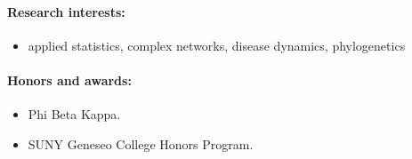\documentclass[a4paper]{article}
\begin{document}
\paragraph{Research interests:}
\begin{itemize}
\item[~] applied statistics, complex networks, disease dynamics, phylogenetics
\end{itemize}

\paragraph{Honors and awards:}
\begin{itemize}
  \item[~] Phi Beta Kappa.
  \item[~] SUNY Geneseo College Honors Program.
\end{itemize}
\end{document}
